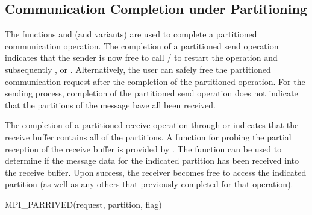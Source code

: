 \subsection{Communication Completion under Partitioning}
\label{subsec:part-commend}

The functions  and  (and
variants) are used to complete a partitioned
communication operation.  The completion of a partitioned send
operation indicates that the sender is now free to call / to restart
the operation and
subsequently ,  or
. Alternatively, the user can safely free 
the partitioned communication request after the completion of
the partitioned operation.
For the sending process, completion of the
partitioned send operation does not indicate that the
partitions of the message have all been received. 

The completion of a partitioned receive operation through  or
 indicates that the receive buffer contains all of the
partitions. A function for probing the partial reception of the receive buffer is provided by 
.
The  function can be used to determine if
the message data for the indicated partition has been received into the receive buffer. Upon success, the
receiver becomes free to access the indicated partition (as well as any others
that previously completed for that operation).  

\begin{funcdef}{MPI\_PARRIVED}{(\mbox{request}, \mbox{partition}, \mbox{flag})}
\end{funcdef}

